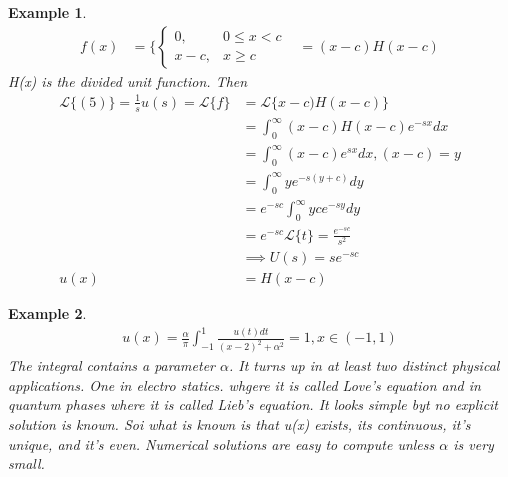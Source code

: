 \documentclass[10pt, oneside]{article}
\newtheorem{example}{Example}
\begin{document}
\begin{example}
    \begin{align*}
    f(x) &= \{\begin{cases} 0, & 0 \leq x < c \\
        x-c, & x \geq c
    \end{cases}
    & = (x-c)H(x-c)
    \end{align*}
    H(x) is the divided unit function. Then 
    \begin{align*}
        \mathscr{L} \{ (5) \} = \frac{1}{s} u(s) = \mathscr{L}\{ f\} & = \mathscr{L}\{ x-c)H(x-c)\} \\
        & = \int_{0}^{\infty} (x-c)H(x-c) e^{-sx}dx\\
        & = \int_{0}^{\infty} (x-c)e^{sx} dx, (x-c) = y\\
        & = \int_{0} ^{\infty} ye^{ -s(y+c)}dy \\
        & = e^{-sc}\int_{0} ^{\infty} yce^{-sy}dy\\
        & = e^{- sc}\mathscr{L} \{ t\} = \frac{e^{-sc}}{s^{2}} \\
        & \implies U(s) =se^{-sc} \\
        u(x) &= H(x-c)  
    \end{align*}

\end{example}
\begin{example}
    \begin{align*}
        u(x) = \frac{\alpha}{\pi} \int_{-1}^{1} \frac{u(t)dt}{(x-2)^{2}+\alpha^{2}} =1, x\in (-1,1)
    \end{align*}
    The integral contains a parameter $\alpha$. It turns up in at least two distinct physical applications. One in electro statics. whgere it is called Love's equation and in quantum phases where it is called Lieb's equation. It looks simple byt no explicit solution is known. Soi what is known is that u(x) exists, its continuous, it's unique, and it's even. Numerical solutions are easy to compute unless $\alpha$ is very small.  
\end{example}
\end{document}
